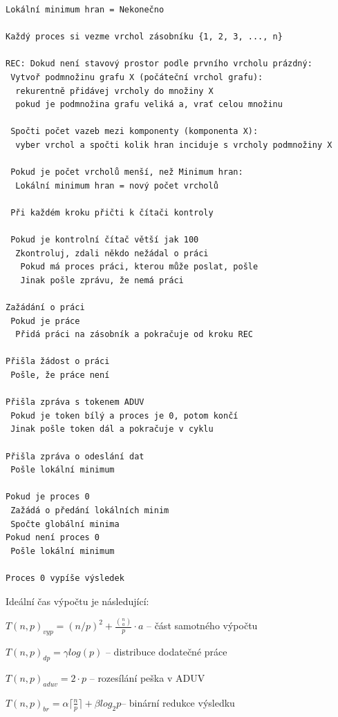 \documentclass[a4paper,10pt]{report}
\begin{document}
\begin{verbatim}
Lokální minimum hran = Nekonečno

Každý proces si vezme vrchol zásobníku {1, 2, 3, ..., n}

REC: Dokud není stavový prostor podle prvního vrcholu prázdný:
 Vytvoř podmnožinu grafu X (počáteční vrchol grafu):
  rekurentně přidávej vrcholy do množiny X
  pokud je podmnožina grafu veliká a, vrať celou množinu

 Spočti počet vazeb mezi komponenty (komponenta X):
  vyber vrchol a spočti kolik hran inciduje s vrcholy podmnožiny X
 
 Pokud je počet vrcholů menší, než Minimum hran:
  Lokální minimum hran = nový počet vrcholů

 Při každém kroku přičti k čítači kontroly

 Pokud je kontrolní čítač větší jak 100
  Zkontroluj, zdali někdo nežádal o práci
   Pokud má proces práci, kterou může poslat, pošle
   Jinak pošle zprávu, že nemá práci

Zažádání o práci
 Pokud je práce
  Přidá práci na zásobník a pokračuje od kroku REC

Přišla žádost o práci
 Pošle, že práce není

Přišla zpráva s tokenem ADUV
 Pokud je token bílý a proces je 0, potom končí
 Jinak pošle token dál a pokračuje v cyklu

Přišla zpráva o odeslání dat
 Pošle lokální minimum

Pokud je proces 0
 Zažádá o předání lokálních minim
 Spočte globální minima
Pokud není proces 0
 Pošle lokální minimum

Proces 0 vypíše výsledek
\end{verbatim}

Ideální čas výpočtu je následující:

\hspace{1cm}

$T(n,p)_{vyp} = (n/p)^2 + \frac{{n \choose a}}{p}\cdot a$ -- část samotného výpočtu

\hspace{1cm}

$T(n,p)_{dp} = \gamma log(p)$ -- distribuce dodatečné práce

\hspace{1cm}

$T(n,p)_{aduv} = 2 \cdot p$ -- rozesílání peška v ADUV

\hspace{1cm}

$T(n,p)_{br} = \alpha \lceil \frac{n}{p} \rceil + \beta log_{2}p$-- binární redukce výsledku
\end{document}

